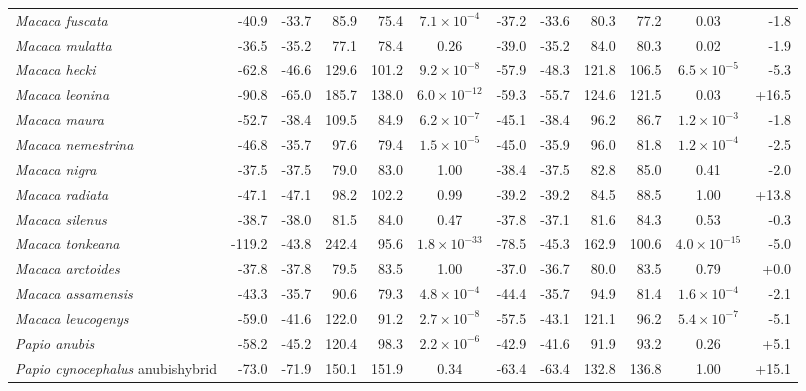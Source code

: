 \begin{table}[H]
{\begin{tabular}{l rr rr c rr rr c r}
        \textit{Macaca fuscata} & -40.9 & -33.7 & 85.9 & 75.4 & $7.1\!\times\!10^{-4}$ & -37.2 & -33.6 & 80.3 & 77.2 & 0.03 & -1.8 \\
        \textit{Macaca mulatta} & -36.5 & -35.2 & 77.1 & 78.4 & 0.26 & -39.0 & -35.2 & 84.0 & 80.3 & 0.02 & -1.9 \\
        \textit{Macaca hecki} & -62.8 & -46.6 & 129.6 & 101.2 & $9.2\!\times\!10^{-8}$ & -57.9 & -48.3 & 121.8 & 106.5 & $6.5\!\times\!10^{-5}$ & -5.3 \\
        \textit{Macaca leonina} & -90.8 & -65.0 & 185.7 & 138.0 & $6.0\!\times\!10^{-12}$ & -59.3 & -55.7 & 124.6 & 121.5 & 0.03 & +16.5 \\
        \textit{Macaca maura} & -52.7 & -38.4 & 109.5 & 84.9 & $6.2\!\times\!10^{-7}$ & -45.1 & -38.4 & 96.2 & 86.7 & $1.2\!\times\!10^{-3}$ & -1.8 \\
        \textit{Macaca nemestrina} & -46.8 & -35.7 & 97.6 & 79.4 & $1.5\!\times\!10^{-5}$ & -45.0 & -35.9 & 96.0 & 81.8 & $1.2\!\times\!10^{-4}$ & -2.5 \\
        \textit{Macaca nigra} & -37.5 & -37.5 & 79.0 & 83.0 & 1.00 & -38.4 & -37.5 & 82.8 & 85.0 & 0.41 & -2.0 \\
        \textit{Macaca radiata} & -47.1 & -47.1 & 98.2 & 102.2 & 0.99 & -39.2 & -39.2 & 84.5 & 88.5 & 1.00 & +13.8 \\
        \textit{Macaca silenus} & -38.7 & -38.0 & 81.5 & 84.0 & 0.47 & -37.8 & -37.1 & 81.6 & 84.3 & 0.53 & -0.3 \\
        \textit{Macaca tonkeana} & -119.2 & -43.8 & 242.4 & 95.6 & $1.8\!\times\!10^{-33}$ & -78.5 & -45.3 & 162.9 & 100.6 & $4.0\!\times\!10^{-15}$ & -5.0 \\
        \textit{Macaca arctoides} & -37.8 & -37.8 & 79.5 & 83.5 & 1.00 & -37.0 & -36.7 & 80.0 & 83.5 & 0.79 & +0.0 \\
        \textit{Macaca assamensis} & -43.3 & -35.7 & 90.6 & 79.3 & $4.8\!\times\!10^{-4}$ & -44.4 & -35.7 & 94.9 & 81.4 & $1.6\!\times\!10^{-4}$ & -2.1 \\
        \textit{Macaca leucogenys} & -59.0 & -41.6 & 122.0 & 91.2 & $2.7\!\times\!10^{-8}$ & -57.5 & -43.1 & 121.1 & 96.2 & $5.4\!\times\!10^{-7}$ & -5.1 \\
        \textit{Papio anubis} & -58.2 & -45.2 & 120.4 & 98.3 & $2.2\!\times\!10^{-6}$ & -42.9 & -41.6 & 91.9 & 93.2 & 0.26 & +5.1 \\
        \textit{Papio cynocephalus} anubishybrid & -73.0 & -71.9 & 150.1 & 151.9 & 0.34 & -63.4 & -63.4 & 132.8 & 136.8 & 1.00 & +15.1 \\

\end{tabular}}
\end{table}
